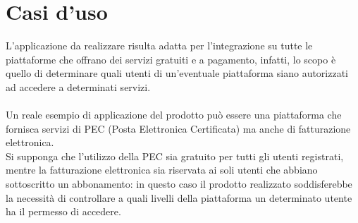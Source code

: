 \section{Casi d'uso}\label{sec:casiuso}
L'applicazione da realizzare risulta adatta per l'integrazione su tutte le piattaforme che offrano dei servizi gratuiti e a pagamento, infatti, lo scopo è quello di 
determinare quali utenti di un'eventuale piattaforma siano autorizzati ad accedere a determinati servizi.\\ \\
Un reale esempio di applicazione del prodotto può essere una piattaforma che fornisca servizi di PEC (Posta Elettronica Certificata) ma anche di fatturazione elettronica.\\
Si supponga che l'utilizzo della PEC sia gratuito per tutti gli utenti registrati, mentre la fatturazione elettronica sia riservata ai soli utenti che abbiano sottoscritto 
un abbonamento: in questo caso il prodotto realizzato soddisferebbe la necessità di controllare a quali livelli della piattaforma un determinato utente ha il permesso di accedere.
